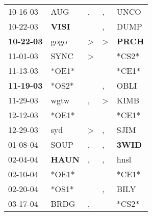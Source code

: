 \begin{supertabular}{p{0.07\textwidth}p{0.06\textwidth}p{0.02\textwidth}p{0.02\textwidth}p{0.06\textwidth}}
          10-16-03\textsuperscript{} &            AUG\textsuperscript{} &                , &                , &           UNCO\textsuperscript{} \\
          10-22-03\textsuperscript{} &  \textbf{VISI\textsuperscript{}} &                  &                , &           DUMP\textsuperscript{} \\
 \textbf{10-22-03\textsuperscript{}} &           gogo\textsuperscript{} &     \textgreater &     \textgreater &  \textbf{PRCH\textsuperscript{}} \\
          11-01-03\textsuperscript{} &           SYNC\textsuperscript{} &     \textgreater &                  &                            *CS2* \\
          11-13-03\textsuperscript{} &                            *OE1* &                  &                  &                            *CE1* \\
 \textbf{11-19-03\textsuperscript{}} &                            *OS2* &                  &                , &           OBLI\textsuperscript{} \\
          11-29-03\textsuperscript{} &           wgtw\textsuperscript{} &                , &     \textgreater &           KIMB\textsuperscript{} \\
          12-12-03\textsuperscript{} &                            *OE1* &                  &                  &                            *CE1* \\
          12-29-03\textsuperscript{} &            syd\textsuperscript{} &     \textgreater &                , &           SJIM\textsuperscript{} \\
          01-08-04\textsuperscript{} &           SOUP\textsuperscript{} &                , &                , &  \textbf{3WID\textsuperscript{}} \\
          02-04-04\textsuperscript{} &  \textbf{HAUN\textsuperscript{}} &                , &                , &           hnsl\textsuperscript{} \\
          02-10-04\textsuperscript{} &                            *OE1* &                  &                  &                            *CE1* \\
          02-20-04\textsuperscript{} &                            *OS1* &                  &                , &           BILY\textsuperscript{} \\
          03-17-04\textsuperscript{} &           BRDG\textsuperscript{} &                , &                  &                            *CS2* \\

\end{supertabular}
